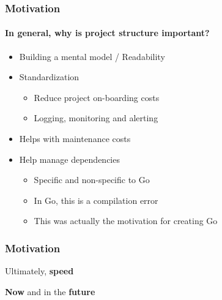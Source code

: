 
\begin{frame}
  \frametitle{Motivation}
  \framesubtitle{In general, why is project structure important?}

  \pause
  \begin{itemize}
    \item Building a mental model / Readability
    \pause
    \item Standardization
    \begin{itemize}
      \item Reduce project on-boarding costs
      \item Logging, monitoring and alerting
    \end{itemize}
  \pause
  \item Helps with maintenance costs
  \pause
  \item Help manage dependencies
    \begin{itemize}
      \item Specific and non-specific to Go
      \item In Go, this is a compilation error
      \item This was actually the motivation for creating Go
    \end{itemize}
  \end{itemize}
\end{frame}

\begin{frame}
  \frametitle{Motivation}
  \centering
  \LARGE
  Ultimately, \textbf{speed}

  \pause
  \vspace{1em}
  \textbf{Now} and in the \textbf{future}
\end{frame}
